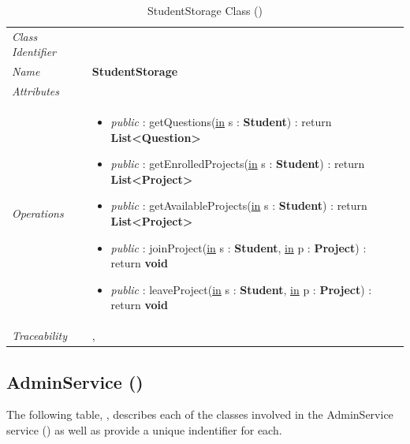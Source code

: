 \documentclass[12pt,letterpaper]{article}
\begin{document}
\begin{table}[H]
    \caption{StudentStorage Class ()} 
	\begin{tabu} to 
		\toprule
		Class Identifier &  \\
		Name & {\bf StudentStorage} \\
		Attributes & \\

		Operations &
		\begin{minipage}[t]{\linewidth}
			\begin{itemize}
			    \item {\it public} : getQuestions(\underline{in} s : {\bf Student}) : return {\bf List<Question>}
			    \item {\it public} : getEnrolledProjects(\underline{in} s : {\bf Student}) : return {\bf List<Project>}
			    \item {\it public} : getAvailableProjects(\underline{in} s : {\bf Student}) : return {\bf List<Project>}
			    \item {\it public} : joinProject(\underline{in} s : {\bf Student}, \underline{in} p : {\bf Project}) : return {\bf void}
			    \item {\it public} : leaveProject(\underline{in} s : {\bf Student}, \underline{in} p : {\bf Project}) : return {\bf void}
	        \end{itemize}
	    \end{minipage} \\
	    	Traceability & , \\
		\toprule
	\end{tabu}
\end{table}

\subsection{AdminService ()}

The following table, , describes each of the classes involved in the AdminService service () as well as provide a unique indentifier for each.
\end{document}
